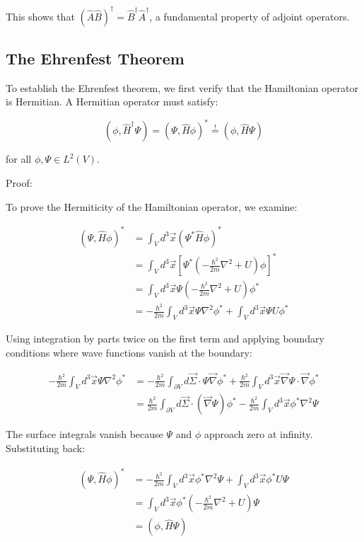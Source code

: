 \documentclass[italian]{HKNdocument}
\begin{document}
This shows that $(\hat{A}\hat{B})^\dagger = \hat{B}^\dagger\hat{A}^\dagger$, a fundamental property of adjoint operators.

\subsection{The Ehrenfest Theorem}

To establish the Ehrenfest theorem, we first verify that the Hamiltonian operator is Hermitian. A Hermitian operator must satisfy:

\begin{equation}
(\phi, \hat{H}^\dagger\Psi) = (\Psi, \hat{H}\phi)^* \stackrel{!}{=} (\phi, \hat{H}\Psi)
\end{equation}

for all $\phi, \Psi \in L^2(V)$.

Proof:


To prove the Hermiticity of the Hamiltonian operator, we examine:

\begin{align}
(\Psi, \hat{H}\phi)^* &= \int_V d^3\vec{x}(\Psi^*\hat{H}\phi)^* \\
&= \int_V d^3\vec{x}\left[\Psi^*\left(-\frac{\hbar^2}{2m}\nabla^2 + U\right)\phi\right]^* \\
&= \int_V d^3\vec{x}\Psi\left(-\frac{\hbar^2}{2m}\nabla^2 + U\right)\phi^*  \\
&= -\frac{\hbar^2}{2m}\int_V d^3\vec{x}\Psi\nabla^2\phi^* + \int_V d^3\vec{x}\Psi U\phi^*
\end{align}

Using integration by parts twice on the first term and applying boundary conditions where wave functions vanish at the boundary:

\begin{align}
-\frac{\hbar^2}{2m}\int_V d^3\vec{x}\Psi\nabla^2\phi^* &= -\frac{\hbar^2}{2m}\int_{\partial V}d\vec{\Sigma}\cdot\Psi\vec{\nabla}\phi^* + \frac{\hbar^2}{2m}\int_V d^3\vec{x}\vec{\nabla}\Psi\cdot\vec{\nabla}\phi^*  \\
&= \frac{\hbar^2}{2m}\int_{\partial V}d\vec{\Sigma}\cdot(\vec{\nabla}\Psi)\phi^* - \frac{\hbar^2}{2m}\int_V d^3\vec{x}\phi^*\nabla^2\Psi
\end{align}

The surface integrals vanish because $\Psi$ and $\phi$ approach zero at infinity. Substituting back:

\begin{align}
(\Psi, \hat{H}\phi)^* &= -\frac{\hbar^2}{2m}\int_V d^3\vec{x}\phi^*\nabla^2\Psi + \int_V d^3\vec{x}\phi^*U\Psi \\
&= \int_V d^3\vec{x}\phi^*\left(-\frac{\hbar^2}{2m}\nabla^2 + U\right)\Psi \\
&= (\phi, \hat{H}\Psi)
\end{align}
\end{document}
